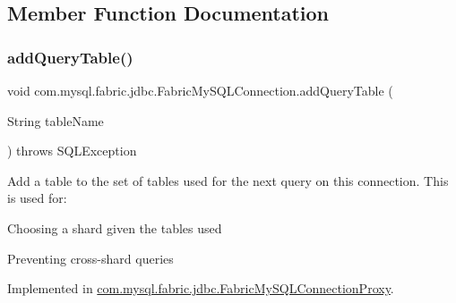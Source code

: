 \subsection{Member Function Documentation}
\mbox{\label{interfacecom_1_1mysql_1_1fabric_1_1jdbc_1_1_fabric_my_s_q_l_connection_a5e830f9ef0fa1d0bae2d5dab997629c3}} 
\subsubsection{\texorpdfstring{add\+Query\+Table()}{addQueryTable()}}
{\footnotesize\ttfamily void com.\+mysql.\+fabric.\+jdbc.\+Fabric\+My\+S\+Q\+L\+Connection.\+add\+Query\+Table (\begin{DoxyParamCaption}\item[{String}]{table\+Name }\end{DoxyParamCaption}) throws S\+Q\+L\+Exception}

Add a table to the set of tables used for the next query on this connection. This is used for\+: 
\begin{DoxyItemize}
\item Choosing a shard given the tables used 
\item Preventing cross-\/shard queries 
\end{DoxyItemize}

Implemented in \mbox{\hyperlink{classcom_1_1mysql_1_1fabric_1_1jdbc_1_1_fabric_my_s_q_l_connection_proxy_a5d4617f3849c2bad7d52f5e2991e01ab}{com.\+mysql.\+fabric.\+jdbc.\+Fabric\+My\+S\+Q\+L\+Connection\+Proxy}}.

